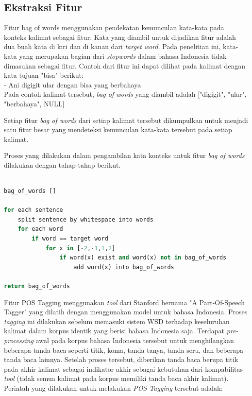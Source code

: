 \subsection{Ekstraksi Fitur}
Fitur bag of words menggunakan pendekatan kemunculan kata-kata pada konteks kalimat sebagai fitur. Kata yang diambil untuk dijadikan fitur adalah dua buah kata di kiri dan di kanan dari \textit{target word}. Pada penelitian ini, kata-kata yang merupakan bagian dari \textit{stopwords} dalam bahasa Indonesia tidak dimasukan sebagai fitur. Contoh dari fitur ini dapat dilihat pada kalimat dengan kata tujuan "bisa" berikut:
\\
- Ani digigit ular dengan bisa yang berbahaya
\\
Pada contoh kalimat tersebut, \textit{bag of words} yang diambil adalah ["digigit", "ular", "berbahaya", NULL]

Setiap fitur \textit{bag of words} dari setiap kalimat tersebut dikumpulkan untuk menjadi satu fitur besar yang mendeteksi kemunculan kata-kata tersebut pada setiap kalimat.

Proses yang dilakukan dalam pengambilan kata konteks untuk fitur \textit{bag of words} dilakukan dengan tahap-tahap berikut.

\begin{lstlisting}[language=python,caption={Fitur Bag of Words}, label={fitur-bag-of-words}]

bag_of_words []

for each sentence
	split sentence by whitespace into words
	for each word
		if word == target word
			for x in [-2,-1,1,2]
				if word(x) exist and word(x) not in bag_of_words
					add word(x) into bag_of_words
					
return bag_of_words

\end{lstlisting}

Fitur POS Tagging menggunakan \textit{tool} dari Stanford bernama "A Part-Of-Speech Tagger" yang dilatih dengan menggunakan model untuk bahasa Indonesia. Proses \textit{tagging} ini dilakukan sebelum memasuki sistem WSD terhadap keseluruhan kalimat dalam korpus identik yang berisi bahasa Indonesia saja. Terdapat \textit{pre-processing} awal pada korpus bahasa Indonesia tersebut untuk menghilangkan beberapa tanda baca seperti titik, koma, tanda tanya, tanda seru, dan beberapa tanda baca lainnya. Setelah proses tersebut, diberikan tanda baca berupa titik pada akhir kalimat sebagai indikator akhir sebagai kebutuhan dari kompabilitas \textit{tool} (tidak semua kalimat pada korpus memiliki tanda baca akhir kalimat). Perintah yang dilakukan untuk melakukan \textit{POS Tagging} tersebut adalah:

